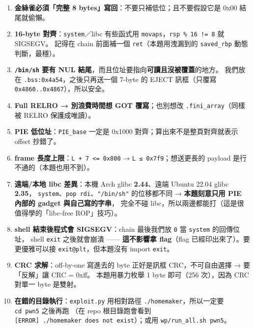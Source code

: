 \documentclass[10pt,a4paper]{article}
\begin{document}
\begin{enumerate}
  \texttt{payload+1} 開始複製，所以自己排 payload
  時\textbf{容易整體差一格}， 結果金絲雀沒對上 →
  \texttt{***\ \allowbreak{}stack\ \allowbreak{}smashing\ \allowbreak{}detected\ \allowbreak{}***}（SIGABRT）。
  建議：先用紙畫表（見 §7.3）或用 gdb 在 epilogue 檢查
  \texttt{{[}rbp-\allowbreak{}8{]}}。
\item
  \textbf{金絲雀必須「完整 8 bytes」寫回}：不要只補低位；且不要假設它是
  0x00 結尾就偷懶。
\item
  \textbf{16-byte 對齊}：\texttt{system}／libc 有些函式用
  \texttt{movaps}，\texttt{rsp\ \allowbreak{}\%\allowbreak{}\ \allowbreak{}16\ \allowbreak{}!=\ \allowbreak{}8} 就 SIGSEGV。 記得在 chain
  前面補一個 \texttt{ret}（本題用洩漏到的 \texttt{saved\_\allowbreak{}rbp}
  動態判斷，最穩）。
\item
  \textbf{\texttt{/\allowbreak{}bin/\allowbreak{}sh} 要有 NUL
  結尾}，而且位址要指向\textbf{可讀且沒被覆蓋}的地方。 我們放在
  \texttt{.\allowbreak{}bss:\allowbreak{}0x4a54}，之後只再送一個 7-byte 的 EJECT 訊框（只覆寫
  \texttt{0x4860..\allowbreak{}0x4867}），所以安全。
\item
  \textbf{Full RELRO → 別浪費時間想 GOT 覆寫}；也別想改
  \texttt{.\allowbreak{}fini\_\allowbreak{}array}（同樣被 RELRO 保護成唯讀）。
\item
  \textbf{PIE 低位址}：\texttt{PIE\_\allowbreak{}base} 一定是 0x1000
  對齊；算出來不是整頁對齊就表示 offset 抄錯了。
\item
  \textbf{frame 長度上限}：\texttt{L\ \allowbreak{}+\ \allowbreak{}7\ \allowbreak{}\textless{}\allowbreak{}=\ \allowbreak{}0x800} →
  \texttt{L\ \allowbreak{}≤\ \allowbreak{}0x7f9}；想送更長的 payload 是行不通的（本題也用不到）。
\item
  \textbf{遠端/本地 libc 差異}：本機 Arch glibc \textbf{2.44}、遠端
  Ubuntu 22.04 glibc \textbf{2.35}，
  \texttt{system}、\texttt{pop\ \allowbreak{}rdi}、\texttt{"/\allowbreak{}bin/\allowbreak{}sh"} 的位移都不同 →
  \textbf{本題刻意只用 PIE 內部的 gadget 與自己寫的字串}， 完全不碰
  libc，所以兩邊都能打（這是很值得學的「libc-free ROP」技巧）。
\item
  \textbf{shell 結束後程式會 SIGSEGV}：chain 最後我們放 \texttt{0} 當
  \texttt{system} 的回傳位址， shell \texttt{exit} 之後就會崩潰 ------
  \textbf{這不影響拿 flag}（flag 已經印出來了）。要更優雅可以接
  \texttt{exit@plt}，但本題沒有 import \texttt{exit}。
\item
  \textbf{CRC 求解}：off-by-one 寫進去的 byte 正好是訊框
  CRC，不可自由選擇 → 要「反解」讓 CRC = 0xff。 本題用暴力枚舉 1 byte
  即可（256 次），因為 CRC 對單一 byte 是雙射。
\item
  \textbf{在錯的目錄執行}：\texttt{exploit.\allowbreak{}py} 用相對路徑
  \texttt{./\allowbreak{}homemaker}，所以一定要 \texttt{cd\ \allowbreak{}pwn5} 之後再跑 （在 repo
  根目錄跑會看到
  \texttt{{[}ERROR{]}\ \allowbreak{}\textquotesingle{}\allowbreak{}./\allowbreak{}homemaker\textquotesingle{}\allowbreak{}\ \allowbreak{}does\ \allowbreak{}not\ \allowbreak{}exist}）；或用
  \texttt{wp/\allowbreak{}run\_\allowbreak{}all.\allowbreak{}sh\ \allowbreak{}pwn5}。
\end{enumerate}
\end{document}
